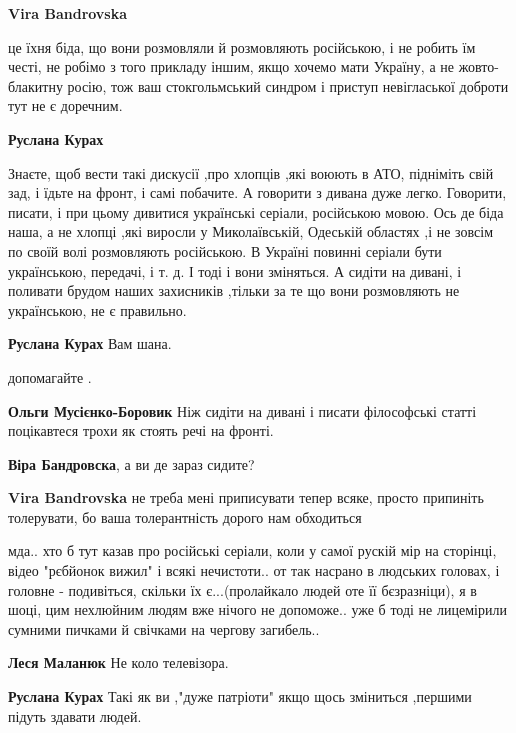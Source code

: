 \begin{itemize}
\begin{itemize}
\textbf{Vira Bandrovska} 

це їхня біда, що вони розмовляли й розмовляють російською, і не робить їм
честі, не робімо з того прикладу іншим, якщо хочемо мати Україну, а не
жовто-блакитну росію, тож ваш стокгольмський синдром і приступ невігласької
доброти тут не є доречним.

\textbf{Руслана Курах} 

Знаєте, щоб вести такі дискусії ,про хлопців ,які воюють в АТО, підніміть свій
зад, і їдьте на фронт, і самі побачите. А говорити з дивана дуже легко.
Говорити, писати, і при цьому дивитися українські серіали, російською мовою. Ось
де біда наша, а не хлопці ,які виросли у Миколаївській, Одеській областях ,і не
зовсім по своїй волі розмовляють російською. В Україні повинні серіали бути
українською, передачі, і т. д. І тоді і вони зміняться. А сидіти на дивані, і
поливати брудом наших захисників ,тільки за те що вони розмовляють не
українською, не є правильно.

\textbf{Руслана Курах} Вам шана.

допомагайте .

\textbf{Ольги Мусієнко-Боровик} Ніж сидіти на дивані і писати філософські статті поцікавтеся трохи як стоять речі на фронті.

\textbf{Віра Бандровска}, а ви де зараз сидите?

\textbf{Vira Bandrovska} не треба мені приписувати тепер всяке, просто припиніть толерувати, бо ваша толерантність дорого нам обходиться


мда.. хто б тут казав про російські серіали, коли у самої рускій мір на
сторінці, відео "рєбйонок вижил" і всякі нечистоти.. от так насрано в людських
головах, і головне - подивіться, скільки їх є...(пролайкало людей оте її
бєзразніци), я в шоці, цим нехлюйним людям вже нічого не допоможе.. уже б тоді
не лицемірили сумними пичками й свічками на чергову загибель..

\textbf{Леся Маланюк} Не коло телевізора.

\textbf{Руслана Курах} Такі як ви ,"дуже патріоти" якщо щось зміниться ,першими підуть здавати людей.



\end{itemize}
\end{itemize}
